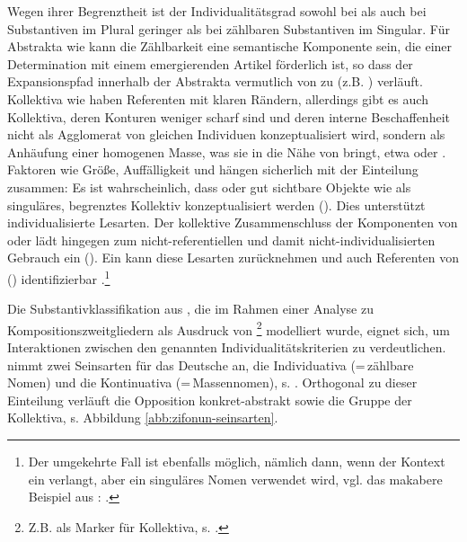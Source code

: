 Wegen ihrer Begrenztheit ist der Individualitätsgrad  sowohl bei  als auch bei Substantiven  im Plural  geringer als bei zählbaren Substantiven  im  Singular. Für Abstrakta  wie  kann die Zählbarkeit eine semantische Komponente sein, die einer Determination mit einem emergierenden Artikel förderlich ist, so dass der Expansionspfad  innerhalb der Abstrakta  vermutlich von  zu  (z.B. ) verläuft. Kollektiva  wie  haben Referenten mit klaren Rändern, allerdings gibt es auch  Kollektiva, deren Konturen weniger scharf sind und deren interne Beschaffenheit nicht als Agglomerat von gleichen Individuen konzeptualisiert wird, sondern als Anhäufung einer homogenen Masse, was sie in die Nähe von  bringt, etwa  oder  \parencite[s.][120--121]{Zifonun2012}. 
Faktoren wie Größe, Auffälligkeit und  hängen sicherlich mit der Einteilung zusammen: Es ist wahrscheinlich, dass  oder gut sichtbare Objekte wie  als singuläres, begrenztes Kollektiv  konzeptualisiert werden (). Dies unterstützt individualisierte Lesarten. Der kollektive  Zusammenschluss der Komponenten von  oder  lädt hingegen zum nicht-referentiellen  und damit nicht-individualisierten  Gebrauch ein (). Ein  kann diese Lesarten zurücknehmen und auch Referenten von  () identifizierbar .\footnote{Der umgekehrte Fall ist ebenfalls möglich, nämlich dann, wenn der Kontext ein  verlangt, aber ein singuläres Nomen verwendet wird, vgl. das makabere Beispiel aus \textcite[81]{Corbett2000}: .} 

Die Substantivklassifikation  aus \textcite[104]{Zifonun2012}, die im Rahmen einer Analyse zu Kompositionszweitgliedern  als Ausdruck von  \footnote{Z.B. als Marker für  Kollektiva, s. \textcite[101]{Zifonun2012}.} modelliert wurde, eignet sich, um  Interaktionen zwischen den genannten Individualitätskriterien  zu verdeutlichen. \textcite[103]{Zifonun2012} nimmt \parencite[basierend auf den Ausführungen von][]{Rijkhoff1991,Rijkhoff2002} zwei Seinsarten für das Deutsche an, die Individuativa (=\,zählbare Nomen) und die Kontinuativa (=\,Massennomen), s. . Orthogonal zu dieser Einteilung verläuft die Opposition konkret-abstrakt sowie die Gruppe der  Kollektiva, s. Abbildung \ref{abb:zifonun-seinsarten}.

